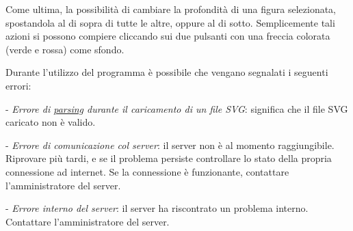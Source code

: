  
\vspace{50pt}
Come ultima, la possibilit\` a di cambiare la profondit\` a di una figura selezionata, spostandola al di sopra di tutte le altre, oppure al di sotto. Semplicemente tali azioni si possono compiere cliccando sui due pulsanti con una freccia colorata (verde e rossa) come sfondo. 
\newpage

 
 
 
 
 
Durante l'utilizzo del programma \`e possibile che vengano segnalati i seguenti errori:
\begin{elencopuntato}[\subsecindent]
\item[-] \textit{Errore di \underline{parsing} durante il caricamento di un file SVG}: significa che il file SVG caricato non \`e valido.
\item[-] \textit{Errore di comunicazione col server}: il server non \`e al momento raggiungibile. Riprovare pi\`u tardi, e se il problema persiste controllare lo stato della propria connessione ad internet. Se la connessione \`e funzionante, contattare l'amministratore del server.
\item[-] \textit{Errore interno del server}: il server ha riscontrato un problema interno. Contattare l'amministratore del server.
\end{elencopuntato} 

